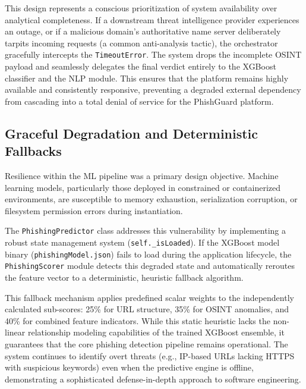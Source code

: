 This design represents a conscious prioritization of system availability
over analytical completeness. If a downstream threat intelligence
provider experiences an outage, or if a malicious domain's authoritative
name server deliberately tarpits incoming requests (a common
anti-analysis tactic), the orchestrator gracefully intercepts the
\texttt{TimeoutError}. The system drops the incomplete OSINT payload and
seamlessly delegates the final verdict entirely to the XGBoost
classifier and the NLP module. This ensures that the platform remains
highly available and consistently responsive, preventing a degraded
external dependency from cascading into a total denial of service for
the PhishGuard platform.

\subsection{Graceful Degradation and Deterministic
Fallbacks}\label{graceful-degradation-and-deterministic-fallbacks}

Resilience within the ML pipeline was a primary design objective.
Machine learning models, particularly those deployed in constrained or
containerized environments, are susceptible to memory exhaustion,
serialization corruption, or filesystem permission errors during
instantiation.

The \texttt{PhishingPredictor} class addresses this vulnerability by
implementing a robust state management system
(\texttt{self.\_isLoaded}). If the XGBoost model binary
(\texttt{phishingModel.json}) fails to load during the application
lifecycle, the \texttt{PhishingScorer} module detects this degraded
state and automatically reroutes the feature vector to a deterministic,
heuristic fallback algorithm.

This fallback mechanism applies predefined scalar weights to the
independently calculated sub-scores: 25\% for URL structure, 35\% for
OSINT anomalies, and 40\% for combined feature indicators. While this
static heuristic lacks the non-linear relationship modeling capabilities
of the trained XGBoost ensemble, it guarantees that the core phishing
detection pipeline remains operational. The system continues to identify
 overt threats (e.g., IP-based URLs lacking HTTPS with suspicious
 keywords) even when the predictive engine is offline, demonstrating a
 sophisticated defense-in-depth approach to software engineering.

